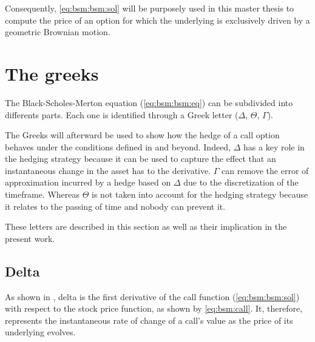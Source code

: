 \documentclass[12pt]{report}
\begin{document}
Consequently, \cref{eq:bsm:bsm:sol} will be purposely used in this master thesis to compute the price of an option for which the underlying is exclusively driven by a geometric Brownian motion.






% 




\section{The greeks}
\label{sec:greeks}


The Black-Scholes-Merton equation (\ref{eq:bsm:bsm:eq}) can be subdivided into differents parts.
Each one is identified through a Greek letter ($\Delta$, $\Theta$, $\Gamma$). 

The Greeks will afterward be used to show how the hedge of a call option behaves under the conditions defined in \citet{bs} and beyond. 
Indeed, $\Delta$ has a key role in the hedging strategy because it can be used to capture the effect that an instantaneous change in the asset has to the derivative.
$\Gamma$ can remove the error of approximation incurred by a hedge based on $\Delta$ due to the discretization of the timeframe.
Whereas $\Theta$ is not taken into account for the hedging strategy because it relates to the passing of time and nobody can prevent it.

These letters are described in this section as well as their implication in the present work.
\subsection{Delta}
\label{sub:Delta}

As shown in \citet{shreve}, delta is the first derivative of the call function (\ref{eq:bsm:bsm:sol}) with respect to the stock price function, as shown by \cref{eq:bsm:call}.
It, therefore, represents the instantaneous rate of change of a call's value as the price of its underlying evolves.
\end{document}
